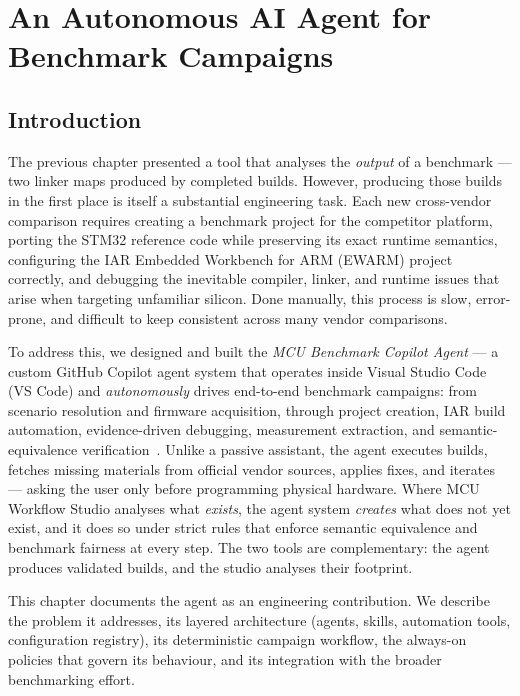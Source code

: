 \chapter{An Autonomous AI Agent for Benchmark Campaigns}
\label{chap:benchmark-agent}

\section*{Introduction}

The previous chapter presented a tool that analyses the \emph{output} of a benchmark ---
two linker maps produced by completed builds. However, producing those builds in the first
place is itself a substantial engineering task. Each new cross-vendor comparison requires
creating a benchmark project for the competitor platform, porting the STM32 reference code
while preserving its exact runtime semantics, configuring the IAR Embedded Workbench for
ARM (EWARM) project correctly, and debugging the inevitable compiler, linker, and runtime
issues that arise when targeting unfamiliar silicon. Done manually, this process is slow,
error-prone, and difficult to keep consistent across many vendor comparisons.

To address this, we designed and built the \emph{MCU Benchmark Copilot Agent} --- a custom
GitHub Copilot agent system that operates inside Visual Studio Code (VS Code) and
\emph{autonomously} drives end-to-end benchmark campaigns: from scenario resolution and
firmware acquisition, through project creation, IAR build automation, evidence-driven
debugging, measurement extraction, and semantic-equivalence verification~\cite{vscode,
github-copilot}. Unlike a passive assistant, the agent executes builds, fetches missing
materials from official vendor sources, applies fixes, and iterates --- asking the user
only before programming physical hardware. Where MCU Workflow Studio analyses what
\emph{exists}, the agent system \emph{creates} what does not yet exist, and it does so
under strict rules that enforce semantic equivalence and benchmark fairness at every step.
The two tools are complementary: the agent produces validated builds, and the studio
analyses their footprint.

This chapter documents the agent as an engineering contribution. We describe the problem it
addresses, its layered architecture (agents, skills, automation tools, configuration
registry), its deterministic campaign workflow, the always-on policies that govern its
behaviour, and its integration with the broader benchmarking effort.

